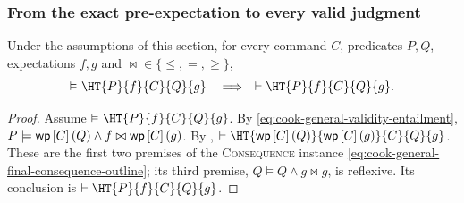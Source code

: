 \subsubsection{From the exact pre-expectation to every valid judgment}

\begin{theorem}[Completeness]
\label{thm:cook-relative-completeness}
Under the assumptions of this section, for every command $C$, predicates
$P,Q$, expectations $f,g$ and $\bowtie\in\{\leq,=,\geq\}$,
\[
  \valid\HT{P}{f}{C}{Q}{g}
  \quad\Longrightarrow\quad
  \vdash\HT{P}{f}{C}{Q}{g}.
\]
\end{theorem}

\begin{proof}
Assume $\valid\HT{P}{f}{C}{Q}{g}$.  By
\eqref{eq:cook-general-validity-entailment},
$P\models\mathsf{wp}\left[{C}\right]\left({Q}\right)\land f\bowtie\mathsf{wp}\left[{C}\right]\left({g}\right)$.  By
,
$\vdash\HT{\WP{C}{Q}}{\WP{C}{g}}{C}{Q}{g}$.  These are the first two premises
of the \textsc{Consequence} instance
\eqref{eq:cook-general-final-consequence-outline}; its third premise,
$Q\models Q\land g\bowtie g$, is reflexive.  Its conclusion is
$\vdash\HT{P}{f}{C}{Q}{g}$.
\end{proof}

